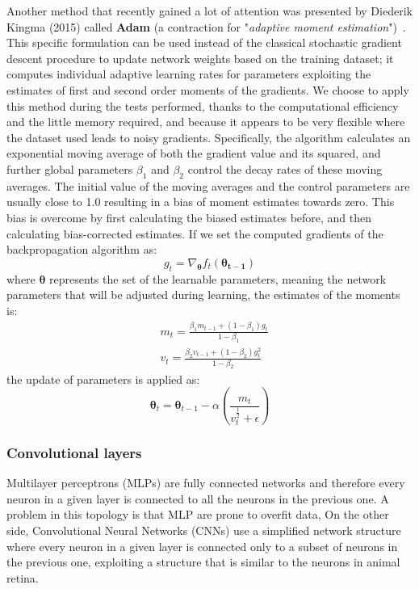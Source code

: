 Another method that recently gained a lot of attention was presented by Diederik Kingma (2015) called \textbf{Adam} (a contraction for "\textit{adaptive moment estimation}")~\cite{kingma2014adam}. This specific formulation can be used instead of the classical stochastic gradient descent procedure to update network weights based on the training dataset; it computes individual adaptive learning rates for parameters exploiting the estimates of first and second order moments of the gradients. 
We choose to apply this method during the tests performed, thanks to the computational efficiency and the little memory required, and because it appears to be very flexible where the dataset used leads to noisy gradients.
Specifically, the algorithm calculates an exponential moving average of both the gradient value and its squared, and further global parameters $\beta_1$ and $\beta_2$ control the decay rates of these moving averages. 
The initial value of the moving averages and the control parameters are usually close to 1.0 resulting in a bias of moment estimates towards zero. This bias is overcome by first calculating the biased estimates before, and then calculating bias-corrected estimates.
If we set the computed gradients of the backpropagation algorithm as:
\begin{equation}
    g_t = \nabla_{\bm{\theta}} f_t(\bm{\theta_{t-1}})
\end{equation}
where $\bm{\theta}$ represents the set of the learnable parameters, meaning the network parameters that will be adjusted during learning, the estimates of the moments is:
\begin{align}
    & m_t = \frac{\beta_1 m_{t-1} + (1 - \beta_1) g_t  }{1-\beta_1} \\
    & v_t = \frac{\beta_2 v_{t-1} + (1 - \beta_2) g_t^2}{1-\beta_2}
\end{align}
the update of parameters is applied as:
\begin{equation}
    \bm{\theta}_t = \bm{\theta}_{t-1} - \alpha \left( \frac{m_t}{v_t^\frac{1}{2} + \epsilon} \right)
\end{equation}

\subsubsection{Convolutional layers}
Multilayer perceptrons (MLPs) are fully connected networks and therefore every neuron in a given layer is connected to all the neurons in the previous one. A problem in this topology is that MLP are prone to overfit data, On the other side, Convolutional Neural Networks (CNNs) use a simplified network structure where every neuron in a given layer is connected only to a subset of neurons in the previous one, exploiting a structure that is similar to the neurons in animal retina. 


